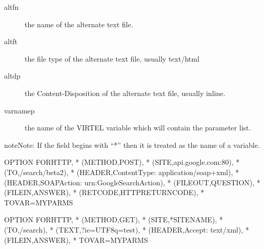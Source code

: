 \documentclass[letterpaper,10pt,english]{sphinxmanual}
\begin{document}
\begin{description}
\item[{altfn}] \leavevmode
the name of the alternate text file.

\item[{altft}] \leavevmode
the file type of the alternate text file, usually text/html

\item[{altdp}] \leavevmode
the Content-Disposition of the alternate text file, usually inline.

\item[{varnamep}] \leavevmode
the name of the VIRTEL variable which will contain the parameter list.

\end{description}

\begin{sphinxadmonition}{note}{Note:}
If the field begins with “*” then it is treated as the name of a variable.
\end{sphinxadmonition}


\begin{sphinxVerbatim}[commandchars=\\\{\}]
OPTION\PYGZdl{} FOR\PYGZhy{}HTTP,                                  *
    (METHOD,\PYGZsq{}POST\PYGZsq{}),                               *
    (SITE,\PYGZsq{}api.google.com:80\PYGZsq{}),                    *
    (TO,\PYGZsq{}/search/beta2\PYGZsq{}),                          *
    (HEADER,\PYGZsq{}Content\PYGZhy{}Type: application/soap+xml\PYGZsq{}), *
    (HEADER,\PYGZsq{}SOAPAction: urn:GoogleSearchAction\PYGZsq{}), *
    (FILE\PYGZhy{}OUT,\PYGZsq{}QUESTION\PYGZsq{}),                         *
    (FILE\PYGZhy{}IN,\PYGZsq{}ANSWER\PYGZsq{}),                            *
    (RET\PYGZhy{}CODE,\PYGZsq{}HTTP\PYGZhy{}RETURN\PYGZhy{}CODE\PYGZsq{}),                 *
    TOVAR=\PYGZsq{}MYPARMS\PYGZsq{}
\end{sphinxVerbatim}

\begin{sphinxVerbatim}[commandchars=\\\{\}]
OPTION\PYGZdl{} FOR\PYGZhy{}HTTP,                                  *
    (METHOD,\PYGZsq{}GET\PYGZsq{}),                                *
    (SITE,\PYGZsq{}*SITENAME\PYGZsq{}),                            *
    (TO,\PYGZsq{}/search\PYGZsq{}),                                *
    (TEXT,\PYGZsq{}?ie=UTF\PYGZhy{}8\PYGZam{}q=test\PYGZsq{}),                     *
    (HEADER,\PYGZsq{}Accept: text/xml\PYGZsq{}),                   *
    (FILE\PYGZhy{}IN,\PYGZsq{}ANSWER\PYGZsq{}),                            *
    TOVAR=\PYGZsq{}MYPARMS\PYGZsq{}
\end{sphinxVerbatim}
\end{document}
